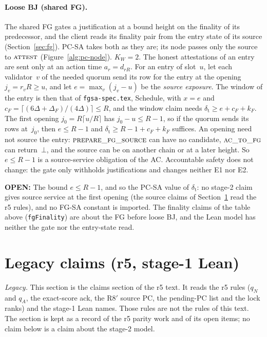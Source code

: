 \documentclass{article}
\newcommand{\OPEN}[1]{\par\noindent\textbf{OPEN:} #1\par}
\newcommand{\nm}[1]{\nolinkurl{#1}}
\begin{document}
\paragraph{Loose BJ (shared FG).}
The shared FG gates a justification at a bound height on the finality of
its predecessor, and the client reads its finality pair from the entry
state of its source (Section~\ref{sec:fg}).  PC-SA takes both as they
are; its node passes only the source to $\Call{attest}{}$
(Figure~\ref{alg:pc-node}).  $K_W=2$.  The honest attestations of an
entry are sent only at an action time $a_r=d_{rR}$.  For an entry of
slot~$u$, let each validator~$v$ of the needed quorum send its row for the
entry at the opening $j_v=r_vR\geq u$, and let $e=\max_v(j_v-u)$ be the
\emph{source exposure}.  The window of the entry is then that of
\nm{fgsa-spec.tex}, Schedule, with $x=e$ and
$c_F=\lceil(6\Delta+\Delta_F)/(4\Delta)\rceil\leq R$, and the window claim
needs $\delta_{\mathrm{t}}\geq e+c_F+k_F$.  The first opening
$j_0=R\lceil u/R\rceil$ has $j_0-u\leq R-1$, so if the quorum sends its
rows at~$j_0$, then $e\leq R-1$ and $\delta_{\mathrm{t}}\geq
R-1+c_F+k_F$ suffices.  An opening need not source the entry:
$\Call{prepare\_fg\_source}{}$ can have no candidate,
$\Call{ac\_to\_fg}{}$ can return~$\bot$, and the source can be on
another chain or at a later height.  So $e\leq R-1$ is a source-service
obligation of the AC.  Accountable safety does not change: the gate only
withholds justifications and changes neither E1 nor E2.
\OPEN{The bound $e\leq R-1$, and so the PC-SA value of
$\delta_{\mathrm{t}}$: no stage-2 claim gives source service at the first
opening (the source claims of Section~\ref{sec:legacy-claims} read the r5
rules), and no FG-SA constant is imported.  The finality claims of the
table above (\nm{fgFinality}) are about the FG before loose BJ, and the
Lean model has neither the gate nor the entry-state read.}

\section{Legacy claims (r5, stage-1 Lean)}\label{sec:legacy-claims}

\emph{Legacy.}  This section is the claims section of the r5 text.  It
reads the r5 rules ($q_N$ and $q_A$, the exact-score ack, the R8$'$ source
PC, the pending-PC list and the lock ranks) and the stage-1 Lean names.
Those rules are not the rules of this text.  The section is kept as a
record of the r5 parity work and of its open items; no claim below is a
claim about the stage-2 model.
\end{document}
